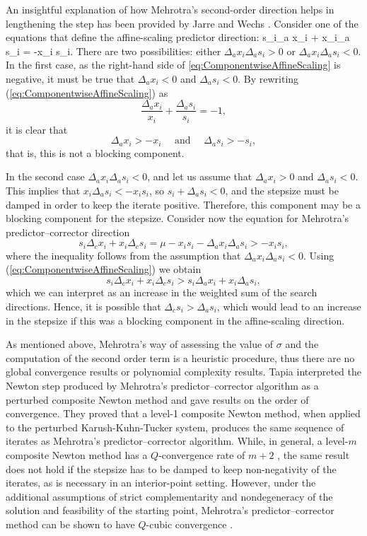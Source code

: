 
An insightful explanation of how Mehrotra's second-order direction
helps in lengthening the step has been provided by
Jarre and Wechs \cite{JarreWechs}.
Consider one of the equations that define the affine-scaling
predictor direction:
\be  \label{eq:ComponentwiseAffineScaling}
  s_i\Delta_a x_i + x_i\Delta_a s_i = -x_i s_i.
\ee
There are two possibilities: either $\Delta_a x_i \Delta_a s_i > 0$
or $\Delta_a x_i \Delta_a s_i < 0$. In the first case, as the right-hand side
of \eqref{eq:ComponentwiseAffineScaling} is negative, it must be true
that $\Delta_a x_i < 0$ and $\Delta_a s_i < 0$.
By rewriting (\ref{eq:ComponentwiseAffineScaling}) as
\[
  \frac{\Delta_a x_i}{x_i} + \frac{\Delta_a s_i}{s_i} = -1,
\]
it is clear that 
\[
  \Delta_a x_i > -x_i \quad \text{ and } \quad \Delta_a s_i > -s_i,
\]
that is, this is not a blocking component.

In the second case $\Delta_a x_i \Delta_a s_i < 0$, and let us assume that 
$\Delta_a x_i > 0$ and $\Delta_a s_i < 0$. 
This implies that $x_i\Delta_a s_i < -x_is_i$, so
$s_i + \Delta_a s_i < 0$, and the stepsize must be damped
in order to keep the iterate positive. Therefore,
this component may be a blocking component for the stepsize.
Consider now the equation for Mehrotra's predictor--corrector
direction
\[
  s_i\Delta_c x_i + x_i\Delta_c s_i = \mu -x_i s_i -\Delta_a x_i\Delta_a s_i 
                                    > -x_i s_i,
\]
where the inequality follows from the assumption that
$\Delta_a x_i \Delta_a s_i < 0$.
Using (\ref{eq:ComponentwiseAffineScaling}) we obtain
\[
  s_i\Delta_c x_i + x_i\Delta_c s_i > s_i\Delta_a x_i + x_i\Delta_a s_i,
\]
which we can interpret as an increase in the weighted sum 
of the search directions. Hence, it is possible that 
$\Delta_c s_i > \Delta_a s_i$, which would lead to an increase in
the stepsize if this was a blocking component in the 
affine-scaling direction.

As mentioned above, Mehrotra's way of assessing the value of $\sigma$
and the computation of the second order term is a heuristic procedure,
thus there are 
no global convergence results or polynomial complexity results. 
Tapia \etal \cite{TapiaZhangSaltzmanWeiser} interpreted the Newton step 
produced by Mehrotra's predictor--corrector algorithm as a perturbed
composite Newton method and gave results on the order of convergence. 
They proved that a level-1 composite Newton method, when applied 
to the perturbed Karush-Kuhn-Tucker system, produces the same 
sequence of iterates as Mehrotra's predictor--corrector algorithm. 
While, in general, a level-$m$ composite Newton method has 
a $Q$-convergence rate of $m+2$ \cite{OrtegaRheinboldt},
the same result does not hold 
if the stepsize has to be damped to keep non-negativity of the iterates, 
as is necessary in an interior-point setting. However, under 
the additional assumptions of strict complementarity and nondegeneracy 
of the solution and feasibility of the starting point, Mehrotra's 
predictor--corrector method can be shown to have $Q$-cubic convergence
\cite{TapiaZhangSaltzmanWeiser}.


